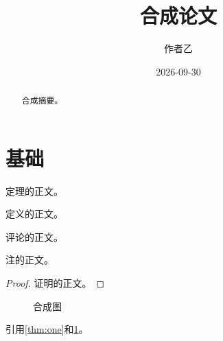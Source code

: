 \documentclass[cn]{elegantpaper}
\title{合成论文}
\author{作者乙}
\institute{合成学院}
\date{2026-09-30}
\begin{document}
\maketitle
\begin{abstract}合成摘要。\end{abstract}
\tableofcontents
\section{基础}\label{sec:intro}
\begin{theorem}[有限性]\label{thm:one}
定理的正文。
\end{theorem}
\begin{definition}[集合]\label{def:one}
定义的正文。
\end{definition}
\begin{remark}
评论的正文。
\end{remark}
\begin{note}
注的正文。
\end{note}
\begin{proof}
证明的正文。
\end{proof}
\begin{figure}\centering\caption{合成图}\label{fig:one}\end{figure}
引用\ref{thm:one}和\ref{fig:one}。
\end{document}
